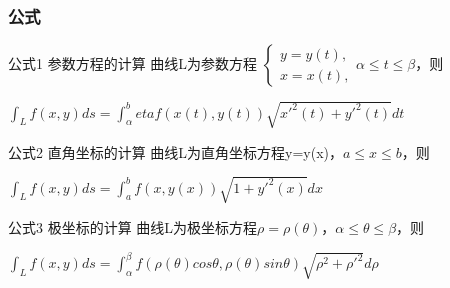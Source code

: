 \documentclass{ctexart}
\begin{document}
\subsubsection{公式}
公式1 参数方程的计算
曲线L为参数方程
$\left\{ 
	\begin{array}{l}
	y=y(t),\\
	x=x(t),
	\end{array}
\right. \alpha \leq t \leq \beta$，则\\
\begin{center}
$\int _Lf(x,y)ds=\int _\alpha ^beta f(x(t),y(t))\sqrt{x'^2(t)+y'^2(t)}dt$
\end{center}\par
公式2 直角坐标的计算
曲线L为直角坐标方程y=y(x)，$a \leq x \leq b$，则
\begin{center}
$\int _L f(x,y)ds = \int _a ^b f(x,y(x))\sqrt{1+y'^2(x)}dx$
\end{center}\par
公式3 极坐标的计算
曲线L为极坐标方程$\rho=\rho (\theta)$，$\alpha \leq \theta \leq \beta$，则
\begin{center}
$\int _L f(x,y)ds=\int _\alpha ^\beta f(\rho (\theta) cos\theta , \rho(\theta) sin \theta)\sqrt{\rho^2+\rho'^2}d\rho$
\end{center}
\end{document}

